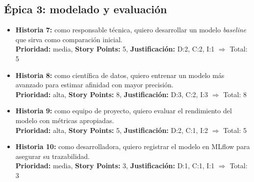 \documentclass[
11pt, %
]{charter}
\begin{document}
\subsection*{\'Epica 3: modelado y evaluación}
\begin{itemize}
  \item \textbf{Historia 7:} como responsable técnica, quiero desarrollar un modelo \textit{baseline} que sirva como comparación inicial.\\
  \textbf{Prioridad:} media, \textbf{Story Points:} 5, \textbf{Justificación:} D:2, C:2, I:1 $\Rightarrow$ Total: 5

  \item \textbf{Historia 8:} como científica de datos, quiero entrenar un modelo más avanzado para estimar afinidad con mayor precisión.\\
  \textbf{Prioridad:} alta, \textbf{Story Points:} 8, \textbf{Justificación:} D:3, C:2, I:3 $\Rightarrow$ Total: 8

  \item \textbf{Historia 9:} como equipo de proyecto, quiero evaluar el rendimiento del modelo con métricas apropiadas.\\
  \textbf{Prioridad:} alta, \textbf{Story Points:} 5, \textbf{Justificación:} D:2, C:1, I:2 $\Rightarrow$ Total: 5

  \item \textbf{Historia 10:} como desarrolladora, quiero registrar el modelo en MLflow para asegurar su trazabilidad.\\
  \textbf{Prioridad:} media, \textbf{Story Points:} 3, \textbf{Justificación:} D:1, C:1, I:1 $\Rightarrow$ Total: 3
\end{itemize}
\end{document}
